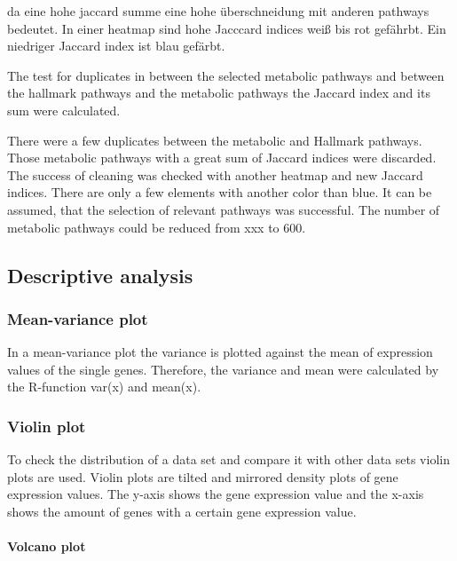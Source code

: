 \documentclass[
]{article}
\begin{document}
da eine hohe jaccard summe eine hohe überschneidung mit anderen pathways
bedeutet. In einer heatmap sind hohe Jacccard indices weiß bis rot
gefährbt. Ein niedriger Jaccard index ist blau gefärbt.

The test for duplicates in between the selected metabolic pathways and
between the hallmark pathways and the metabolic pathways the Jaccard
index and its sum were calculated.

There were a few duplicates between the metabolic and Hallmark pathways.
Those metabolic pathways with a great sum of Jaccard indices were
discarded. The success of cleaning was checked with another heatmap and
new Jaccard indices. There are only a few elements with another color
than blue. It can be assumed, that the selection of relevant pathways
was successful. The number of metabolic pathways could be reduced from
xxx to 600.

\hypertarget{descriptive-analysis}{%
\subsection{Descriptive analysis}\label{descriptive-analysis}}

\hypertarget{mean-variance-plot}{%
\subsubsection{Mean-variance plot}\label{mean-variance-plot}}

In a mean-variance plot the variance is plotted against the mean of
expression values of the single genes. Therefore, the variance and mean
were calculated by the R-function var(x) and mean(x).

\hypertarget{violin-plot}{%
\subsubsection{Violin plot}\label{violin-plot}}

To check the distribution of a data set and compare it with other data
sets violin plots are used. Violin plots are tilted and mirrored density
plots of gene expression values. The y-axis shows the gene expression
value and the x-axis shows the amount of genes with a certain gene
expression value.

\hypertarget{volcano-plot}{%
\paragraph{Volcano plot}\label{volcano-plot}}
\end{document}
